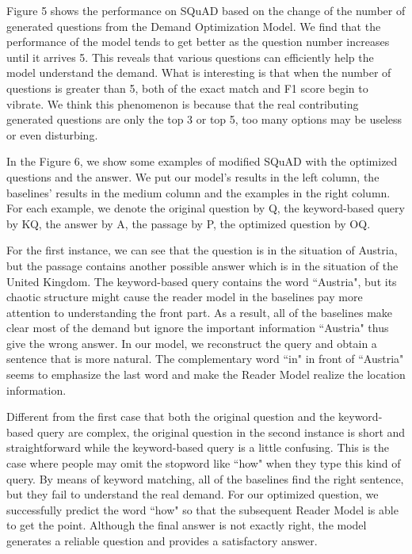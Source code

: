 \documentclass[sigconf]{acmart}
\begin{document}
Figure 5 shows the performance on SQuAD based on the change of the number of generated questions from the Demand Optimization Model. We find that the performance of the model tends to get better as the question number increases until it arrives 5. This reveals that various questions can efficiently help the model understand the demand. What is interesting is that when the number of questions is greater than 5, both of the exact match and F1 score begin to vibrate. We think this phenomenon is because that the real contributing generated questions are only the top 3 or top 5, too many options may be useless or even disturbing.


In the Figure 6, we show some examples of modified SQuAD with the optimized questions and the answer. We put our model's results in the left column, the baselines' results in the medium column and the examples in the right column. For each example, we denote the original question by Q, the keyword-based query by KQ, the answer by A, the passage by P, the optimized question by OQ. 

For the first instance, we can see that the question is in the situation of Austria, but the passage contains another possible answer which is in the situation of the United Kingdom. The keyword-based query contains the word ``Austria", but its chaotic structure might cause the reader model in the baselines pay more attention to understanding the front part. As a result, all of the baselines make clear most of the demand but ignore the important information ``Austria" thus give the wrong answer. In our model, we reconstruct the query and obtain a sentence that is more natural. The complementary word ``in" in front of ``Austria" seems to emphasize the last word and make the Reader Model realize the location information.

Different from the first case that both the original question and the keyword-based query are complex, the original question in the second instance is short and straightforward while the keyword-based query is a little confusing. This is the case where people may omit the stopword like ``how" when they type this kind of query. By means of keyword matching, all of the baselines find the right sentence, but they fail to understand the real demand. For our optimized question, we successfully predict the word ``how" so that the subsequent Reader Model is able to get the point. Although the final answer is not exactly right, the model generates a reliable question and provides a satisfactory answer.
\end{document}
